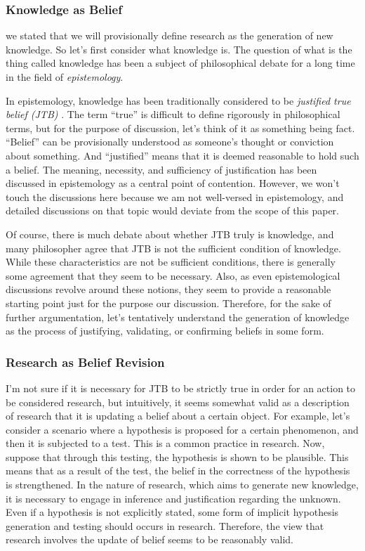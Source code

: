 \documentclass{book}
\begin{document}
\subsubsection{Knowledge as Belief}
we stated that we will provisionally define research as the generation of new knowledge. So let's first consider what knowledge is. The question of what is the thing called knowledge has been a subject of philosophical debate for a long time in the field of \textit{epistemology}.

In epistemology, knowledge has been traditionally considered to be \textit{justified true belief (JTB)} \cite{sep-epistemology}. The term ``true'' is difficult to define rigorously in philosophical terms, but for the purpose of discussion, let's think of it as something being fact. ``Belief'' can be provisionally understood as someone's thought or conviction about something. And ``justified'' means that it is deemed reasonable to hold such a belief. The meaning, necessity, and sufficiency of justification has been discussed in epistemology as a central point of contention. However, we won't touch the discussions here because we am 
 not well-versed in epistemology, and detailed discussions on that topic would deviate from the scope of this paper.

Of course, there is much debate about whether JTB truly is knowledge, and many philosopher agree that JTB is not the sufficient condition of knowledge. While these characteristics are not be sufficient conditions, there is generally some agreement that they seem to be necessary. Also, as even epistemological discussions revolve around these notions, they seem to provide a reasonable starting point just for the purpose our discussion. Therefore, for the sake of further argumentation, let's tentatively understand the generation of knowledge as the process of justifying, validating, or confirming beliefs in some form.

\subsubsection{Research as Belief Revision}
I'm not sure if it is necessary for JTB to be strictly true in order for an action to be considered research, but intuitively, it seems somewhat valid as a description of research that it is updating a belief about a certain object. For example, let's consider a scenario where a hypothesis is proposed for a certain phenomenon, and then it is subjected to a test. This is a common practice in research. Now, suppose that through this testing, the hypothesis is shown to be plausible. This means that as a result of the test, the belief in the correctness of the hypothesis is strengthened. In the nature of research, which aims to generate new knowledge, it is necessary to engage in inference and justification regarding the unknown. Even if a hypothesis is not explicitly stated, some form of implicit hypothesis generation and testing should occurs in research. Therefore, the view that research involves the update of belief seems to be reasonably valid.
\end{document}
